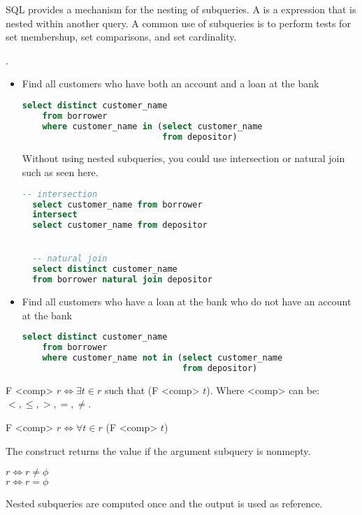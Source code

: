 \documentclass{article}
\begin{document}
SQL provides a mechanism for the nesting of subqueries. A  is a  expression that is nested within another query. A common use of subqueries is to perform tests for set membershup, set comparisons, and set cardinality. 

\begin{example} . \\
  \begin{itemize}
    \item Find all customers who have both an account and a loan at the bank
      \begin{lstlisting}[language=SQL]
  select distinct customer_name 
    from borrower 
    where customer_name in (select customer_name
                            from depositor)
      \end{lstlisting}
      Without using nested subqueries, you could use intersection or natural join such as seen here. 
      \begin{lstlisting}[language=SQL]
  -- intersection
  select customer_name from borrower 
  intersect 
  select customer_name from depositor


  -- natural join 
  select distinct customer_name 
  from borrower natural join depositor
      \end{lstlisting}

    \item Find all customers who have a loan at the bank who do not have an account at the bank
      \begin{lstlisting}[language=SQL]
  select distinct customer_name 
    from borrower 
    where customer_name not in (select customer_name 
                                from depositor)
      \end{lstlisting}
  \end{itemize}
\end{example}

\begin{definition}
  F <comp>  $r \Leftrightarrow \exists t \in r$ such that (F <comp> $t$). Where <comp> can be: $<,\leq,>,=,\neq$. 
\end{definition}

\begin{definition}
  F <comp>  $r \Leftrightarrow \forall t \in r$ (F <comp> $t$)
\end{definition}

The  construct returns the value  if the argument subquery is nonmepty. 
\begin{center}
   $r \Leftrightarrow r \neq \phi$ \\ 
   $r \Leftrightarrow r = \phi$
\end{center}

\begin{remark}
  Nested subqueries are computed once and the output is used as reference. 
\end{remark}
\end{document}
